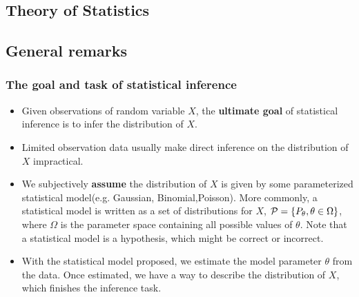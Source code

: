 
\begin{refsection}
\startcontents[chapters]	
\chapter{Theory of Statistics}\label{ch:theory-of-statistics}

\section{General remarks}

\subsection{The goal and task of statistical inference}
\begin{itemize}
	\item Given observations of random variable $X$, the \textbf{ultimate goal} of statistical inference is to infer the distribution of $X$.
	\item Limited observation data usually make direct inference on the distribution of $X$ impractical.
	\item We subjectively \textbf{assume} the distribution of $X$ is given by some parameterized statistical model(e.g. Gaussian, Binomial,Poisson). More commonly, a statistical model is written as a set of distributions for $X$, $\mathcal{P}=\{P_\theta,\theta\in\Omega\}$, where $\Omega$ is the parameter space containing all possible values of $\theta$. Note that a statistical model is a hypothesis, which might be correct or incorrect.
	\item With the statistical model proposed, we estimate the model parameter $\theta$ from the data. Once estimated, we have a way to describe the distribution of $X$, which finishes the inference task.
\end{itemize}


\end{refsection}
